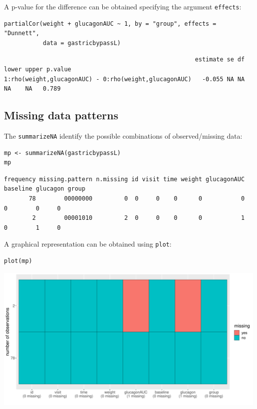 \documentclass[12pt]{article}
\begin{document}
A p-value for the difference can be obtained specifying the argument
\texttt{effects}:
\lstset{language=r,label= ,caption= ,captionpos=b,numbers=none}
\begin{lstlisting}
partialCor(weight + glucagonAUC ~ 1, by = "group", effects = "Dunnett",
           data = gastricbypassL)
\end{lstlisting}

\begin{verbatim}
                                                      estimate se df lower upper p.value
1:rho(weight,glucagonAUC) - 0:rho(weight,glucagonAUC)   -0.055 NA NA    NA    NA   0.789
\end{verbatim}

\subsection{Missing data patterns}
\label{sec:orgd81ea70}

The \texttt{summarizeNA} identify the possible combinations of
observed/missing data:
\lstset{language=r,label= ,caption= ,captionpos=b,numbers=none}
\begin{lstlisting}
mp <- summarizeNA(gastricbypassL)
mp
\end{lstlisting}

\begin{verbatim}
frequency missing.pattern n.missing id visit time weight glucagonAUC baseline glucagon group
       78        00000000         0  0     0    0      0           0        0        0     0
        2        00001010         2  0     0    0      0           1        0        1     0
\end{verbatim}


A graphical representation can be obtained using \texttt{plot}:
\lstset{language=r,label= ,caption= ,captionpos=b,numbers=none}
\begin{lstlisting}
plot(mp)
\end{lstlisting}

\begin{center}
\includegraphics[trim={0 0 0 0},width=1\textwidth]{./figures/summarizeNA.pdf}
\end{center}
\end{document}
